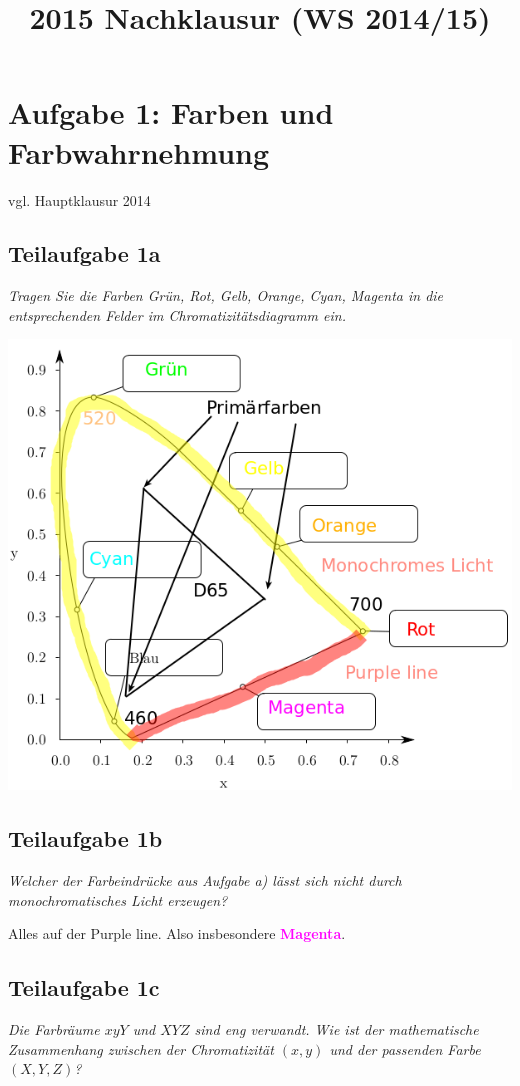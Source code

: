 \documentclass[a4paper]{scrartcl}
\begin{document}
\title{2015 Nachklausur (WS 2014/15)}

\setcounter{section}{1}
\section*{Aufgabe 1: Farben und Farbwahrnehmung}
vgl. Hauptklausur 2014
\subsection*{Teilaufgabe 1a}
\textit{Tragen Sie die Farben Grün, Rot, Gelb, Orange, Cyan, Magenta in die
        entsprechenden Felder im Chromatizitätsdiagramm ein.}

\includegraphics*[width=0.8\linewidth, keepaspectratio]{1a.png}

\subsection*{Teilaufgabe 1b}
\textit{Welcher der Farbeindrücke aus Aufgabe a) lässt sich nicht durch monochromatisches Licht
erzeugen?}

Alles auf der Purple line. Also insbesondere \textcolor{magenta}{\textbf{Magenta}}.

\subsection*{Teilaufgabe 1c}
\textit{Die Farbräume $xyY$ und $XYZ$ sind eng verwandt. Wie ist der
mathematische Zusammenhang zwischen der Chromatizität $(x, y)$ und der
passenden Farbe $(X, Y, Z)$?}
\end{document}
